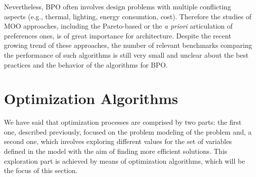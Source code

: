 	Nevertheless, \ac{BPO} often involves design problems with multiple conflicting aspects (e.g., thermal, lighting, energy consumtion, cost). Therefore the studies of \ac{MOO} approaches, including the Pareto-based or the \textit{a priori} articulation of preferences ones, is of great importance for architecture. Despite the recent growing trend of these approaches\cite{Evins2013,Wortmann2017Opossum}, the number of relevant benchmarks comparing the performance of such algorithms is still very small and unclear about the best practices and the behavior of the algorithms for \ac{BPO}.  
	
	

\section{Optimization Algorithms}
\label{sec:optimizationalgorithms}
	
	We have said that optimization processes are comprised by two parts: the first one, described previously, focused on the problem modeling of the problem and, a second one, which involves exploring different values for the set of variables defined in the model with the aim of finding more efficient solutions. This exploration part is achieved by means of optimization algorithms, which will be the focus of this section. 
	
